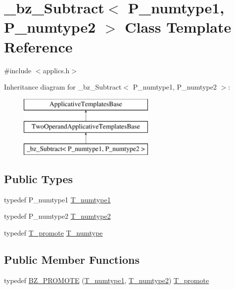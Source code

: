 \hypertarget{class__bz__Subtract}{}\section{\+\_\+bz\+\_\+\+Subtract$<$ P\+\_\+numtype1, P\+\_\+numtype2 $>$ Class Template Reference}
\label{class__bz__Subtract}


{\ttfamily \#include $<$applics.\+h$>$}

Inheritance diagram for \+\_\+bz\+\_\+\+Subtract$<$ P\+\_\+numtype1, P\+\_\+numtype2 $>$\+:\begin{figure}[H]
\begin{center}
\leavevmode
\includegraphics[height=3.000000cm]{class__bz__Subtract}
\end{center}
\end{figure}
\subsection*{Public Types}
\begin{DoxyCompactItemize}
\item 
typedef P\+\_\+numtype1 \hyperlink{class__bz__Subtract_aeb106df778e99c217986b680efbf69ff}{T\+\_\+numtype1}
\item 
typedef P\+\_\+numtype2 \hyperlink{class__bz__Subtract_a4678d506752d16677b34c2d296343a7e}{T\+\_\+numtype2}
\item 
typedef \hyperlink{minmax_8h_aaa88a440c2f0d00798d5b1d42c79308d}{T\+\_\+promote} \hyperlink{class__bz__Subtract_a8116c56e0ad2b52437a3197d303edd61}{T\+\_\+numtype}
\end{DoxyCompactItemize}
\subsection*{Public Member Functions}
\begin{DoxyCompactItemize}
\item 
typedef \hyperlink{class__bz__Subtract_a27db0682e8fe3827ff77baf8f979fcbc}{B\+Z\+\_\+\+P\+R\+O\+M\+O\+T\+E} (\hyperlink{class__bz__Subtract_aeb106df778e99c217986b680efbf69ff}{T\+\_\+numtype1}, \hyperlink{class__bz__Subtract_a4678d506752d16677b34c2d296343a7e}{T\+\_\+numtype2}) \hyperlink{minmax_8h_aaa88a440c2f0d00798d5b1d42c79308d}{T\+\_\+promote}
\end{DoxyCompactItemize}

